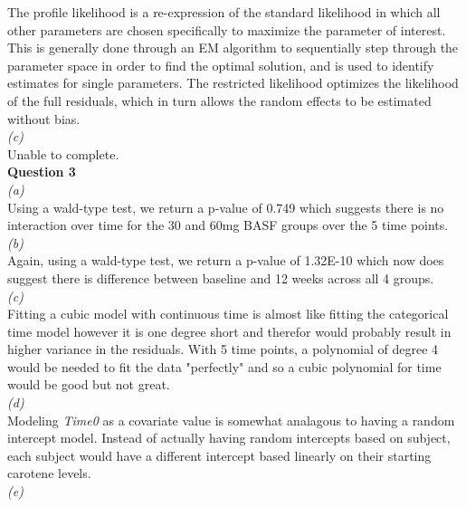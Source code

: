 \documentclass[11pt,a4paper]{article}
\begin{document}
The profile likelihood is a re-expression of the standard likelihood in which all other parameters are chosen specifically to maximize the parameter of interest. This is generally done through an EM algorithm to sequentially step through the parameter space in order to find the optimal solution, and is used to identify estimates for single parameters. The restricted likelihood optimizes the likelihood of the full residuals, which in turn allows the random effects to be estimated without bias.\\

\textit{(c)}\\

Unable to complete.\\

\textbf{Question 3}\\

\textit{(a)}\\

Using a wald-type test, we return a p-value of 0.749 which suggests there is no interaction over time for the 30 and 60mg BASF groups over the 5 time points.\\

\textit{(b)}\\

Again, using a wald-type test, we return a p-value of 1.32E-10 which now does suggest there is difference between baseline and 12 weeks across all 4 groups.\\

\textit{(c)}\\

Fitting a cubic model with continuous time is almost like fitting the categorical time model however it is one degree short and therefor would probably result in higher variance in the residuals. With 5 time points, a polynomial of degree 4 would be needed to fit the data "perfectly" and so a cubic polynomial for time would be good but not great.\\

\textit{(d)}\\

Modeling \textit{Time0} as a covariate value is somewhat analagous to having a random intercept model. Instead of actually having random intercepts based on subject, each subject would have a different intercept based linearly on their starting carotene levels.\\

\textit{(e)}\\
\end{document}
